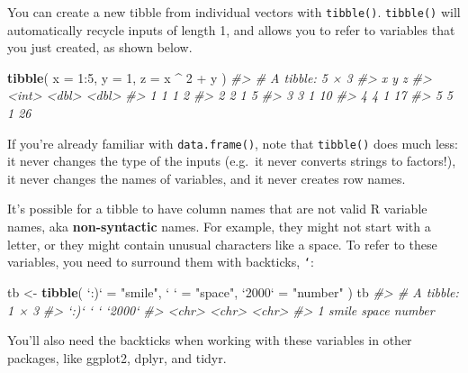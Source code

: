 \documentclass[]{book}
\newenvironment{Shaded}{\begin{snugshade}}{\end{snugshade}}
\newcommand{\KeywordTok}[1]{\textcolor[rgb]{0.13,0.29,0.53}{\textbf{{#1}}}}
\newcommand{\DataTypeTok}[1]{\textcolor[rgb]{0.13,0.29,0.53}{{#1}}}
\newcommand{\DecValTok}[1]{\textcolor[rgb]{0.00,0.00,0.81}{{#1}}}
\newcommand{\StringTok}[1]{\textcolor[rgb]{0.31,0.60,0.02}{{#1}}}
\newcommand{\CommentTok}[1]{\textcolor[rgb]{0.56,0.35,0.01}{\textit{{#1}}}}
\newcommand{\NormalTok}[1]{{#1}}
\begin{document}
You can create a new tibble from individual vectors with
\texttt{tibble()}. \texttt{tibble()} will automatically recycle inputs
of length 1, and allows you to refer to variables that you just created,
as shown below.

\begin{Shaded}
\begin{Highlighting}[]
\KeywordTok{tibble}\NormalTok{(}
  \DataTypeTok{x =} \DecValTok{1}\NormalTok{:}\DecValTok{5}\NormalTok{, }
  \DataTypeTok{y =} \DecValTok{1}\NormalTok{, }
  \DataTypeTok{z =} \NormalTok{x ^}\StringTok{ }\DecValTok{2} \NormalTok{+}\StringTok{ }\NormalTok{y}
\NormalTok{)}
\CommentTok{#> # A tibble: 5 × 3}
\CommentTok{#>       x     y     z}
\CommentTok{#>   <int> <dbl> <dbl>}
\CommentTok{#> 1     1     1     2}
\CommentTok{#> 2     2     1     5}
\CommentTok{#> 3     3     1    10}
\CommentTok{#> 4     4     1    17}
\CommentTok{#> 5     5     1    26}
\end{Highlighting}
\end{Shaded}

If you're already familiar with \texttt{data.frame()}, note that
\texttt{tibble()} does much less: it never changes the type of the
inputs (e.g.~it never converts strings to factors!), it never changes
the names of variables, and it never creates row names.

It's possible for a tibble to have column names that are not valid R
variable names, aka \textbf{non-syntactic} names. For example, they
might not start with a letter, or they might contain unusual characters
like a space. To refer to these variables, you need to surround them
with backticks, \texttt{`}:

\begin{Shaded}
\begin{Highlighting}[]
\NormalTok{tb <-}\StringTok{ }\KeywordTok{tibble}\NormalTok{(}
  \StringTok{`}\DataTypeTok{:)}\StringTok{`} \NormalTok{=}\StringTok{ "smile"}\NormalTok{, }
  \StringTok{`}\DataTypeTok{ }\StringTok{`} \NormalTok{=}\StringTok{ "space"}\NormalTok{,}
  \StringTok{`}\DataTypeTok{2000}\StringTok{`} \NormalTok{=}\StringTok{ "number"}
\NormalTok{)}
\NormalTok{tb}
\CommentTok{#> # A tibble: 1 × 3}
\CommentTok{#>    `:)`   ` ` `2000`}
\CommentTok{#>   <chr> <chr>  <chr>}
\CommentTok{#> 1 smile space number}
\end{Highlighting}
\end{Shaded}

You'll also need the backticks when working with these variables in
other packages, like ggplot2, dplyr, and tidyr.
\end{document}
